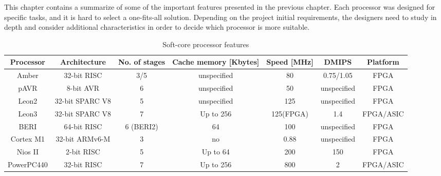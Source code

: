 \hspace{0.5cm} This chapter contains a summarize of some of the important features presented in the
previous chapter. Each processor was designed for specific tasks, and it is hard to select a
one-fits-all solution. Depending on the project initial requirements, the designers need to
study in depth and consider additional characteristics in order to decide which processor is
more suitable.

\begin{table}[!h]
    \tiny
    \centering
    \caption{Soft-core processor features}
    \begin{tabular}{|c|c|c|c|c|c|c|}
    \hline
    Processor & Architecture & No. of stages & Cache memory [Kbytes] & Speed [MHz] & DMIPS & Platform \\ \hline
    Amber & 32-bit RISC & 3/5 & unspecified & 80 & 0.75/1.05 & FPGA \\ \hline
    pAVR & 8-bit AVR & 6 & unspecified & 50 & unspecified & FPGA \\ \hline
    Leon2 & 32-bit SPARC V8 & 5 & unspecified & 125 & unspecified & FPGA \\ \hline
    Leon3 & 32-bit SPARC V8 & 7 & Up to 256 & 125(FPGA) & 1.4 & FPGA/ASIC \\ \hline
    BERI & 64-bit RISC & 6 (BERI2) & 64 & 100 & unspecified & FPGA \\ \hline
    Cortex M1 & 32-bit ARMv6-M & 3 & no & 0.88 & unspecified & FPGA \\ \hline
    Nios II  & 2-bit RISC & 5 & Up to 64 & 200 & 150 & FPGA \\ \hline
    PowerPC440 & 32-bit RISC & 7 & Up to 256 & 800 & 2 & FPGA/ASIC \\ 
    \hline
    \end{tabular}
    \label{tab:table1}
\end{table}